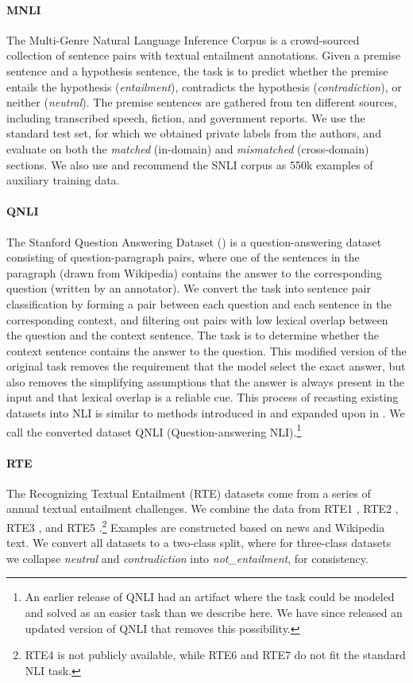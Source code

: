 \documentclass{article} \usepackage{iclr2019_conference,times}
\begin{document}
\paragraph{MNLI}
The Multi-Genre Natural Language Inference Corpus \citep{DBLP:journals/corr/WilliamsNB17} is a crowd-sourced collection of sentence pairs with textual entailment annotations. Given a premise sentence and a hypothesis sentence, the task is to predict whether the premise entails the hypothesis (\textit{entailment}), contradicts the hypothesis (\textit{contradiction}), or neither (\textit{neutral}). The premise sentences are gathered from ten different sources, including transcribed speech, fiction, and government reports. We use the standard test set, for which we obtained private labels from the authors, and evaluate on both the \textit{matched} (in-domain) and \textit{mismatched} (cross-domain) sections. We also use and recommend the SNLI corpus \citep{bowman2015large} as 550k examples of auxiliary training data. 

\paragraph{QNLI}
The Stanford Question Answering Dataset (\citealt{rajpurkar2016squad}) is a question-answering dataset consisting of question-paragraph pairs, where one of the sentences in the paragraph (drawn from Wikipedia) contains the answer to the corresponding question (written by an annotator). We convert the task into sentence pair classification by forming a pair between each question and each sentence in the corresponding context, and filtering out pairs with low lexical overlap between the question and the context sentence. The task is to determine whether the context sentence contains the answer to the question. This modified version of the original task removes the requirement that the model select the exact answer, but also removes the simplifying assumptions that the answer is always present in the input and that lexical overlap is a reliable cue.
This process of recasting existing datasets into NLI is similar to methods introduced in \citet{white2017inference} and expanded upon in \citet{demszky2018transforming}.
We call the converted dataset QNLI (Question-answering NLI).\footnote{An earlier release of QNLI had an artifact where the task could be modeled and solved as an easier task than we describe here. We have since released an updated version of QNLI that removes this possibility.}

\paragraph{RTE}
The Recognizing Textual Entailment (RTE) datasets come from a series of annual textual entailment challenges. We combine the data from RTE1 \citep{dagan2006pascal}, RTE2 \citep{bar2006second}, RTE3 \citep{giampiccolo2007third}, and RTE5 \citep{bentivogli2009fifth}.\footnote{RTE4 is not publicly available, while RTE6 and RTE7 do not fit the standard NLI task.} Examples are constructed based on news and Wikipedia text. 
We convert all datasets to a two-class split, where for three-class datasets we collapse \textit{neutral} and \textit{contradiction} into \textit{not\_entailment}, for consistency.
\end{document}
